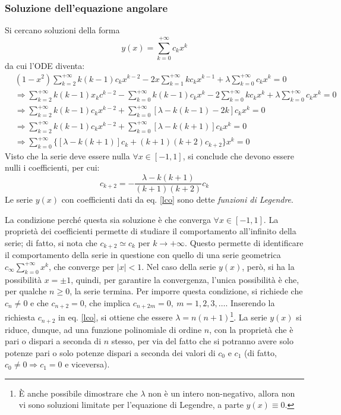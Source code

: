 \documentclass[11pt, a4paper]{scrartcl}
\theoremstyle{definition}
\numberwithin{esempio}{section}
\theoremstyle{definition}
\numberwithin{obs}{section}
\numberwithin{nota}{section}
\numberwithin{equation}{subsection}
\begin{document}
\subsubsection{Soluzione dell'equazione angolare}
Si cercano soluzioni della forma
\[
y(x) = \sum_{k=0}^{+\infty} c_k x^k 
\] 
da cui l'ODE diventa:
\[
	\begin{split}
		&(1-x^2) \sum_{k=2}^{+\infty} k(k-1) c_k x^{k-2} -2x \sum_{k=1}^{+\infty} kc_k x^{k-1} +\lambda \sum_{k=0}^{+\infty} c_k x^k = 0\\
		&\Rightarrow \sum_{k=2}^{+\infty} k(k-1)x_kc^{k-2} - \sum_{k=0}^{+\infty} k(k-1)c_k x^k - 2 \sum_{k=0}^{+\infty} kc_kx^k + \lambda \sum_{k=0}^{+\infty} c_kx^k = 0\\
		&\Rightarrow \sum_{k=2}^{+\infty} k(k-1)c_kx^{k-2} + \sum_{k=0}^{+\infty } \left[ \lambda -k(k-1) - 2k \right] c_kx^k =0 \\
		&\Rightarrow \sum_{k=2}^{+\infty} k(k-1)c_kx^{k-2} + \sum_{k=0}^{+\infty } \left[ \lambda -k(k+1) \right] c_kx^k =0\\
		&\Rightarrow \sum_{k=0}^{+\infty} \big\{\left[ \lambda -k(k+1) \right] c_k + (k+1)(k+2)c_{k+2} \big\} x^k = 0
	\end{split}
\] 
Visto che la serie deve essere nulla $\forall x \in [-1,1]$, si conclude che devono essere nulli i coefficienti, per cui:
\begin{equation}\label{lco}
	c_{k+2}  = -\frac{\lambda - k(k+1)}{(k+1)(k+2)} c_{k} 
\end{equation}
Le serie $y(x)$ con coefficienti dati da eq. \ref{lco} sono dette \textit{funzioni di Legendre}.

La condizione perch\'e questa sia soluzione \`e che converga $\forall x \in [-1,1]$. 
La propriet\`a dei coefficienti permette di studiare il comportamento all'infinito della serie; di fatto, si nota che $c_{k+2} \simeq c_k$ per $k\to +\infty$.
Questo permette di identificare il comportamento della serie in questione con quello di una serie geometrica $c_{\infty} \sum_{k=0}^{+\infty} x^k$, che converge per $\lvert x \rvert <1$.
Nel caso della serie $y(x)$, per\`o, si ha la possibilit\`a $x = \pm 1 $, quindi, per garantire la convergenza, l'unica possibilit\`a \`e che, per qualche $n\ge 0$, la serie termina.
Per imporre questa condizione, si richiede che $c_n \neq 0 $ e che $c_{n+2} = 0$, che implica $c_{n+2m} =0, \ m =1,2,3,\ldots$.
Inserendo la richiesta $c_{n+2} $ in eq. \ref{lco}, si ottiene che essere $\lambda  = n(n+1)$\footnote{\`E anche possibile dimostrare che $\lambda $ non \`e un intero non-negativo, allora non vi sono soluzioni limitate per l'equazione di Legendre, a parte $y(x) \equiv 0$.}.
La serie $y(x)$ si riduce, dunque, ad una funzione polinomiale di ordine $n$, con la propriet\`a che \`e pari o dispari a seconda di $n$ stesso, per via del fatto che si potranno avere solo potenze pari o solo potenze dispari a seconda dei valori di $c_0$ e $c_1$ (di fatto, $c_0 \neq 0 \Rightarrow c_1 = 0$ e viceversa).
\end{document}
